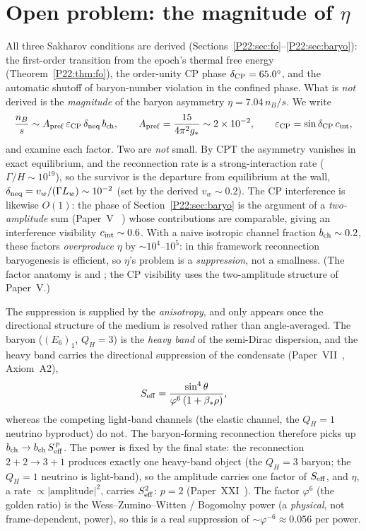 \documentclass[11pt,a4paper]{article}
\theoremstyle{definition}\newtheorem{definition}[theorem]{Definition}
\newcommand{\vp}{\varphi}
\begin{document}
\section{Open problem: the magnitude of $\eta$}
\label{P22:sec:open}
All three Sakharov conditions are derived (Sections~\ref{P22:sec:fo}--\ref{P22:sec:baryo}): the
first-order transition from the epoch's thermal free energy (Theorem~\ref{P22:thm:fo}), the
order-unity CP phase $\delta_{\rm CP}=65.0^\circ$, and the automatic shutoff of baryon-number
violation in the confined phase. What is \emph{not} derived is the \emph{magnitude} of the
baryon asymmetry $\eta=7.04\,n_B/s$. We write
\begin{equation}
  \frac{n_B}{s}\sim A_{\rm pref}\,\varepsilon_{\rm CP}\,\delta_{\rm neq}\,b_{\rm ch},\qquad
  A_{\rm pref}=\frac{15}{4\pi^2 g_*}\sim2\times10^{-2},\qquad
  \varepsilon_{\rm CP}=\sin\delta_{\rm CP}\,c_{\rm int},
  \label{P22:eq:eta}
\end{equation}
and examine each factor. Two are \emph{not} small. By CPT the asymmetry vanishes in exact
equilibrium, and the reconnection rate is a strong-interaction rate ($\Gamma/H\sim10^{19}$), so
the survivor is the departure from equilibrium at the wall, $\delta_{\rm neq}=v_w/(\Gamma L_w)
\sim10^{-2}$ (set by the derived $v_w\sim0.2$). The CP interference is likewise $O(1)$: the
phase of Section~\ref{P22:sec:baryo} is the argument of a \emph{two-amplitude} sum (Paper~V%
~\cite{Paper5}) whose contributions are comparable, giving an interference visibility
$c_{\rm int}\sim0.6$. With a naive isotropic channel fraction $b_{\rm ch}\sim0.2$, these factors
\emph{overproduce} $\eta$ by $\sim10^{4}$--$10^{5}$: in this framework reconnection baryogenesis
is efficient, so $\eta$'s problem is a \emph{suppression}, not a smallness. (The factor anatomy
is  and ; the CP visibility uses the two-amplitude
structure of Paper~V.)

The suppression is supplied by the \emph{anisotropy}, and only appears once the directional
structure of the medium is resolved rather than angle-averaged. The baryon ($(E_6)_1$, $Q_H{=}3$)
is the \emph{heavy band} of the semi-Dirac dispersion, and the heavy band carries the directional
suppression of the condensate (Paper~VII~\cite{Paper7}, Axiom~A2),
\begin{equation}
  S_{\rm eff}=\frac{\sin^4\theta}{\vp^6\,(1+\beta_*\rho)},
  \label{P22:eq:seff}
\end{equation}
whereas the competing light-band channels (the elastic channel, the $Q_H{=}1$ neutrino byproduct)
do not. The baryon-forming reconnection therefore picks up $b_{\rm ch}\to b_{\rm ch}\,S_{\rm eff}^{\,p}$.
The power is fixed by the final state: the reconnection $2+2\to3+1$ produces exactly one heavy-band
object (the $Q_H{=}3$ baryon; the $Q_H{=}1$ neutrino is light-band), so the amplitude carries one
factor of $S_{\rm eff}$, and $\eta$, a rate $\propto|\mathrm{amplitude}|^2$, carries $S_{\rm eff}^2$:
$p=2$ (Paper~XXI~\cite{Paper21}). The factor $\vp^6$ (the golden
ratio) is the Wess--Zumino--Witten / Bogomolny power (a \emph{physical}, not frame-dependent,
power), so this is a real suppression of $\sim\vp^{-6}\approx0.056$ per power.
\end{document}
